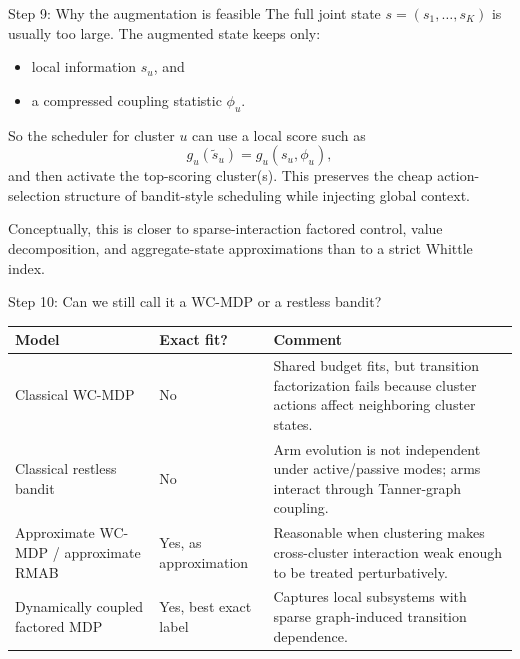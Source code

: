 \documentclass[aspectratio=169,professionalfonts]{beamer}
\begin{document}
\begin{frame}{Step 9: Why the augmentation is feasible}
The full joint state $s=(s_1,\dots,s_K)$ is usually too large. The augmented state keeps only:
\begin{itemize}
  \item local information $s_u$, and
  \item a compressed coupling statistic $\phi_u$.
\end{itemize}
So the scheduler for cluster $u$ can use a local score such as
\[
g_u(\tilde s_u)=g_u(s_u,\phi_u),
\]
and then activate the top-scoring cluster(s). This preserves the cheap action-selection structure of bandit-style scheduling while injecting global context.

\vspace{0.4em}
Conceptually, this is closer to sparse-interaction factored control, value decomposition, and aggregate-state approximations than to a strict Whittle index.
\end{frame}

\begin{frame}{Step 10: Can we still call it a WC-MDP or a restless bandit?}
\begin{center}
\begin{tabularx}{\textwidth}{>{\raggedright\arraybackslash}p{3.2cm} >{\raggedright\arraybackslash}p{2.6cm} X}
\toprule
Model & Exact fit? & Comment \\
\midrule
Classical WC-MDP & No & Shared budget fits, but transition factorization fails because cluster actions affect neighboring cluster states. \\
Classical restless bandit & No & Arm evolution is not independent under active/passive modes; arms interact through Tanner-graph coupling. \\
Approximate WC-MDP / approximate RMAB & Yes, as approximation & Reasonable when clustering makes cross-cluster interaction weak enough to be treated perturbatively. \\
Dynamically coupled factored MDP & Yes, best exact label & Captures local subsystems with sparse graph-induced transition dependence. \\
\bottomrule
\end{tabularx}
\end{center}
\end{frame}
\end{document}

